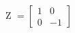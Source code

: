 \documentclass[preview]{standalone}
\begin{document}
\begin{center}
Z $= \begin{bmatrix} 1 & 0 \\ 0 & -1 \end{bmatrix}$
\end{center}
\end{document}
